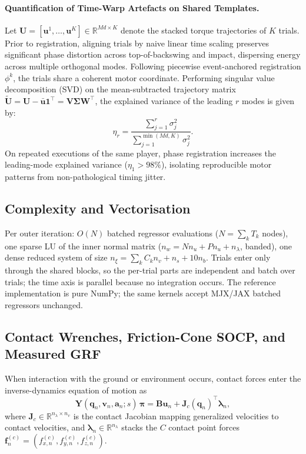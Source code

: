 \documentclass[11pt,a4paper]{article}
\newcommand{\R}{\mathbb{R}}
\newcommand{\bq}{\mathbf{q}}
\newcommand{\bv}{\mathbf{v}}
\newcommand{\ba}{\mathbf{a}}
\newcommand{\bu}{\mathbf{u}}
\newcommand{\bY}{\mathbf{Y}}
\newcommand{\bB}{\mathbf{B}}
\newcommand{\bJ}{\mathbf{J}}
\newcommand{\bpi}{\boldsymbol{\pi}}
\newcommand{\blambda}{\boldsymbol{\lambda}}
\begin{document}
\paragraph{Quantification of Time-Warp Artefacts on Shared Templates.}
Let $\mathbf{U} = [\bu^1, \dots, \bu^K] \in \R^{M d \times K}$ denote the stacked torque trajectories of $K$ trials. Prior to registration, aligning trials by naive linear time scaling preserves significant phase distortion across top-of-backswing and impact, dispersing energy across multiple orthogonal modes. Following piecewise event-anchored registration $\phi^k$, the trials share a coherent motor coordinate. Performing singular value decomposition (SVD) on the mean-subtracted trajectory matrix $\widetilde{\mathbf{U}} = \mathbf{U} - \bar{\bu} \mathbf{1}^\top = \mathbf{V} \boldsymbol{\Sigma} \mathbf{W}^\top$, the explained variance of the leading $r$ modes is given by:
\begin{equation}
\eta_r = \frac{\sum_{j=1}^r \sigma_j^2}{\sum_{j=1}^{\min(Md, K)} \sigma_j^2}.
\end{equation}
On repeated executions of the same player, phase registration increases the leading-mode explained variance ($\eta_1 > 98\%$), isolating reproducible motor patterns from non-pathological timing jitter.


\subsection{Complexity and Vectorisation}
Per outer iteration: $O(N)$ batched regressor evaluations ($N=\sum_k T_k$
nodes), one sparse LU of the inner normal matrix ($n_w=N n_u+Pn_u+n_\lambda$,
banded), one dense reduced system of size $n_\xi=\sum_k C_k n_v+n_s+10n_b$.
Trials enter only through the shared blocks, so the per-trial parts are
independent and batch over trials; the time axis is parallel because no
integration occurs.  The reference implementation is pure NumPy; the same
kernels accept MJX/JAX batched regressors unchanged.

\subsection{Contact Wrenches, Friction-Cone SOCP, and Measured GRF}
\label{sec:contact_wrenches}
When interaction with the ground or environment occurs, contact forces enter
the inverse-dynamics equation of motion as
\begin{equation}
  \bY(\bq_n,\bv_n,\ba_n; s)\,\bpi = \bB\bu_n + \bJ_c(\bq_n)^{\!\top}\blambda_n ,
  \label{eq:contact_eom}
\end{equation}
where $\bJ_c\in\R^{n_\lambda\times n_v}$ is the contact Jacobian mapping generalized velocities
to contact velocities, and $\blambda_n\in\R^{n_\lambda}$ stacks the $C$ contact point forces
$\mathbf{f}^{(c)}_n = (f_{x,n}^{(c)}, f_{y,n}^{(c)}, f_{z,n}^{(c)})$.
\end{document}
